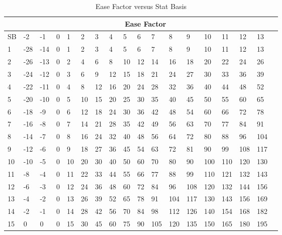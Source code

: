 
\begin{table}[h]
\begin{tabular}{llllllllllllllllll} \hline
	& \multicolumn{16}{c}{Ease Factor} \\ \hline \hline
SB  &-2   &-1    &0    &1    &2    &3    &4    &5    &6    &7    &8    &9   &10   &11   &12   &13 \\ \hline
 1  &-28  &-14    &0    &1    &2    &3    &4    &5    &6    &7    &8    &9   &10   &11   &12   &13 \\
 2  &-26  &-13    &0    &2    &4    &6    &8   &10   &12   &14   &16   &18   &20   &22   &24   &26 \\
 3  &-24  &-12    &0    &3    &6    &9   &12   &15   &18   &21   &24   &27   &30   &33   &36   &39 \\
 4  &-22  &-11    &0    &4    &8   &12   &16   &20   &24   &28   &32   &36   &40   &44   &48   &52 \\
 5  &-20  &-10    &0    &5   &10   &15   &20   &25   &30   &35   &40   &45   &50   &55   &60   &65 \\
 6  &-18   &-9    &0    &6   &12   &18   &24   &30   &36   &42   &48   &54   &60   &66   &72   &78 \\
 7  &-16   &-8    &0    &7   &14   &21   &28   &35   &42   &49   &56   &63   &70   &77   &84   &91 \\
 8  &-14   &-7    &0    &8   &16   &24   &32   &40   &48   &56   &64   &72   &80   &88   &96  &104 \\
 9  &-12   &-6    &0    &9   &18   &27   &36   &45   &54   &63   &72   &81   &90   &99  &108  &117 \\
10  &-10   &-5    &0   &10   &20   &30   &40   &50   &60   &70   &80   &90  &100  &110  &120  &130 \\
11  &-8   &-4    &0   &11   &22   &33   &44   &55   &66   &77   &88   &99  &110  &121  &132  &143 \\
12  &-6   &-3    &0   &12   &24   &36   &48   &60   &72   &84   &96  &108  &120  &132  &144  &156 \\
13  &-4   &-2    &0   &13   &26   &39   &52   &65   &78   &91  &104  &117  &130  &143  &156  &169 \\
14  &-2   &-1    &0   &14   &28   &42   &56   &70   &84   &98  &112  &126  &140  &154  &168  &182 \\
15  &0    &0    &0   &15   &30   &45   &60   &75   &90  &105  &120  &135  &150  &165  &180  &195 \\ \hline
\end{tabular}
\centering
\caption{Ease Factor versus Stat Basis}
\end{table}     

     
     
     
     
     
     
     
     
     
     
     
     
     
     
     
